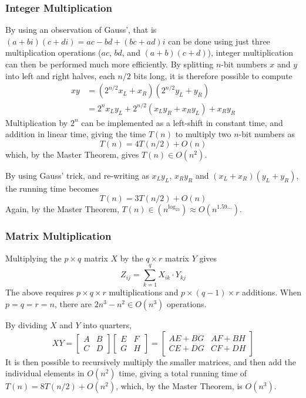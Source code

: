 \documentclass[10pt]{article}
\begin{document}
\subsubsection{Integer Multiplication}
By using an observation of Gauss', that is $(a+bi)(c+di)=ac-bd+(bc+ad)i$ can be done using just three multiplication operations ($ac$, $bd$, and $(a+b)(c+d)$), integer multiplication can then be performed much more efficiently.  By splitting $n$-bit numbers $x$ and $y$ into left and right halves, each $n/2$ bits long, it is therefore possible to compute 
\begin{align*}
	xy&=\left(2^{n/2}x_L+x_R\right)\left(2^{n/2}y_L+y_R\right)\\
	&=2^nx_Ly_L+2^{n/2}\left(x_Ly_R+x_Ry_L\right) + x_Ry_R
\end{align*}
Multiplication by $2^n$ can be implemented as a left-shift in constant time, and addition in linear time, giving the time $T(n)$ to multiply two $n$-bit numbers as \[T(n)=4T(n/2)+O(n)\]which, by the Master Theorem, gives $T(n)\in O(n^2)$.

By using Gauss' trick, and re-writing as $x_Ly_L$, $x_Ry_R$ and $(x_L+x_R)(y_L+y_R)$, the running time becomes \[T(n)=3T(n/2)+O(n)\]Again, by the Master Theorem, $T(n)\in\left(n^{\log_23}\right)\approx O\left(n^{1.59\ldots}\right)$.
\subsubsection{Matrix Multiplication}
Multiplying the $p\times q$ matrix $X$ by the $q\times r$ matrix $Y$ gives \[Z_{ij}=\sum_{k=1}^qX_{ik}\cdot Y_{kj}\]The above requires $p\times q\times r$ multiplications and $p\times(q-1)\times r$ additions.  When $p=q=r=n$, there are $2n^3-n^2\in O(n^3)$ operations.  

By dividing $X$ and $Y$ into quarters, \[XY=\left[\begin{matrix}A&B\\C&D\end{matrix}\right]\left[\begin{matrix}E&F\\G&H\end{matrix}\right]=\left[\begin{matrix}AE+BG&AF+BH\\CE+DG&CF+DH\end{matrix}\right]\]It is then possible to recursively multiply the smaller matrices, and then add the individual elements in $O(n^2)$ time, giving a total running time of $T(n)=8T(n/2)+O(n^2)$, which, by the Master Theorem, is $O(n^3)$.
\end{document}
